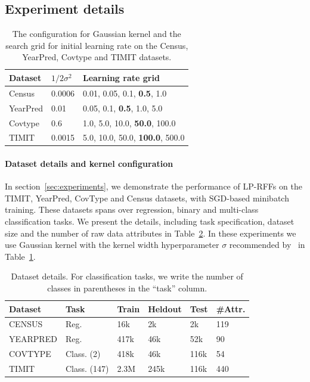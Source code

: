 \subsection{Experiment details}
\label{subsec:app_exp_detail}
\begin{table}
	\caption{The configuration for Gaussian kernel and the search grid for initial learning rate on the Census, YearPred, Covtype and TIMIT datasets.}
	\label{tab:hyperparam}
	\begin{center}
	\begin{tabular}{lll}
	\toprule
	Dataset & $1/2\sigma^2$ & Learning rate grid \\
	\midrule
Census & 0.0006 & {0.01, 0.05, 0.1, \textbf{0.5}, 1.0} \\
YearPred & 0.01 & {0.05, 0.1, \textbf{0.5}, 1.0, 5.0} \\
Covtype & 0.6 & {1.0, 5.0, 10.0, \textbf{50.0}, 100.0} \\
TIMIT & 0.0015 & {5.0, 10.0, 50.0, \textbf{100.0}, 500.0} \\
	\bottomrule
	\end{tabular}
	\end{center}
	\label{tab:kernel_hyper}
\end{table}

\paragraph{Dataset details and kernel configuration}
In section~\ref{sec:experiments}, we demonstrate the performance of LP-RFFs on the TIMIT, YearPred, CovType and Census datasets, with SGD-based minibatch training. These datasets spans over regression, binary and multi-class classification tasks. We present the details, including task specification, dataset size and the number of raw data attributes in Table~\ref{tab:dataset_details}. In these experiments we use Gaussian kernel with the kernel width hyperparameter $\sigma$ recommended by~\cite{may2017} in Table~\ref{tab:kernel_hyper}. 
\begin{table}
	\caption{Dataset details.  For classification tasks, we write the number
		of classes in parentheses in the ``task'' column.}
	\label{tab:datasets}
	\begin{center}
		\begin{tabular}{llllll} 
			\toprule
			\textbf{Dataset}  & \textbf{Task} & \textbf{Train} & \textbf{Heldout} & \textbf{Test} & \textbf{\#Attr.} \\ 
			\midrule
			CENSUS   & Reg.   & 16k   & 2k      & 2k   & 119 \\ 
			YEARPRED & Reg.   & 417k  & 46k     & 52k  & 90  \\ 
			COVTYPE  & Class. (2) & 418k  & 46k     & 116k & 54  \\ 
			TIMIT    & Class. (147) & 2.3M  & 245k    & 116k & 440 \\
			\bottomrule
		\end{tabular}
	\end{center}
	\label{tab:dataset_details}
\end{table}

